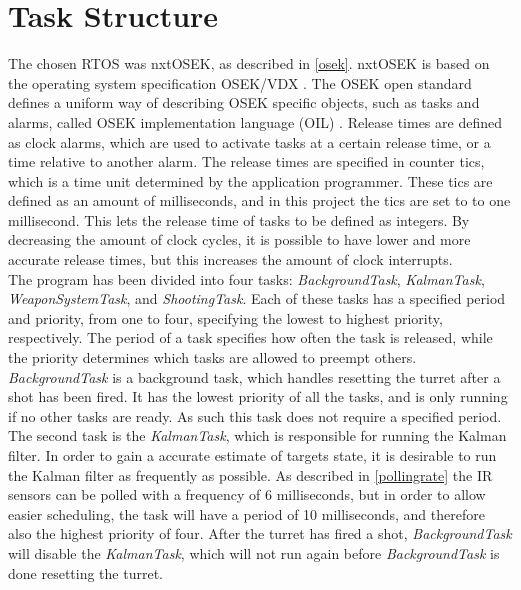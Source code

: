 \section{Task Structure}\label{sec:impl_tasks}
The chosen RTOS was nxtOSEK, as described in \cref{osek}. nxtOSEK is based on the operating system specification OSEK/VDX \cite{OSEK}. The OSEK open standard defines a uniform way of describing OSEK specific objects, such as tasks and alarms, called OSEK implementation language (OIL) \cite{OSEK}. Release times are defined as clock alarms, which are used to activate tasks at a certain release time, or a time relative to another alarm. The release times are specified in counter tics, which is a time unit determined by the application programmer. These tics are defined as an amount of milliseconds, and in this project the tics are set to to one millisecond. This lets the release time of tasks to be defined as integers. By decreasing the amount of clock cycles, it is possible to have lower and more accurate release times, but this increases the amount of clock interrupts. \\

The program has been divided into four tasks: \emph{BackgroundTask}, \emph{KalmanTask}, \emph{WeaponSystemTask}, and \emph{ShootingTask}. Each of these tasks has a specified period and priority, from one to four, specifying the lowest to highest priority, respectively. The period of a task specifies how often the task is released, while the priority determines which tasks are allowed to preempt others. \\

\emph{BackgroundTask} is a background task, which handles resetting the turret after a shot has been fired. It has the lowest priority of all the tasks, and is only running if no other tasks are ready. As such this task does not require a specified period. \\

The second task is the \emph{KalmanTask}, which is responsible for running the Kalman filter. In order to gain a accurate estimate of targets state, it is desirable to run the Kalman filter as frequently as possible. As described in \cref{pollingrate} the IR sensors can be polled with a frequency of 6 milliseconds, but in order to allow easier scheduling, the task will have a period of 10 milliseconds, and therefore also the highest priority of four. After the turret has fired a shot, \emph{BackgroundTask} will disable the \emph{KalmanTask}, which will not run again before \emph{BackgroundTask} is done resetting the turret. \\

